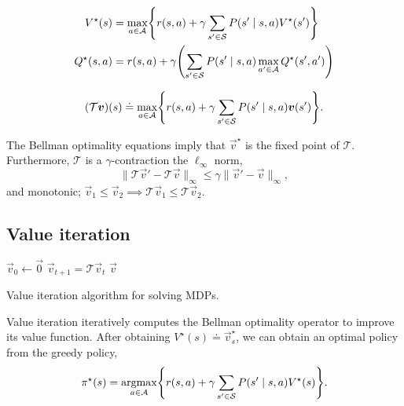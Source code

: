 \begin{theorem}
    \begin{align*}
        V^\star(s)   & = \max_{a\in \mathcal{A}} \lft\{ r(s,a) + \gamma \sum_{s' \in \mathcal{S}} P(s'\mid s,a) V^\star(s') \rgt\}   \\
        Q^\star(s,a) & = r(s,a) + \gamma \lft( \sum_{s' \in \mathcal{S}} P(s'\mid s,a) \max_{a'\in \mathcal{A}} Q^\star(s',a') \rgt) \\
    \end{align*}
\end{theorem}

\begin{definition}
    \[
        (\mathcal{T}\vec{v})(s) \doteq \max_{a\in \mathcal{A}} \lft\{ r(s,a) + \gamma \sum_{s'\in \mathcal{S}} P(s'\mid s,a) \vec{v}(s')  \rgt\}.
    \]
\end{definition}

The Bellman optimality equations imply that $\vec{v}^\star$ is the fixed point of $\mathcal{T}$.
Furthermore, $\mathcal{T}$ is a $\gamma$-contraction \wrt the $\ell_{\infty}$ norm, \[
    \| \mathcal{T} \vec{v}' - \mathcal{T} \vec{v} \|_\infty \leq \gamma \| \vec{v}' - \vec{v} \|_\infty,
\]
and monotonic; $\vec{v}_1 \leq \vec{v}_2 \implies \mathcal{T}\vec{v}_1 \leq \mathcal{T} \vec{v}_2$.

\subsection{Value iteration}

\begin{algorithm}
    \begin{algorithmic}[1]
        \State $\vec{v}_0 \gets \vec{0}$ 
        \State $\vec{v}_{t+1} = \mathcal{T} \vec{v}_t$
        \EndWhile
        \State \Return $\vec{v}$
    \end{algorithmic}
    \caption{Value iteration algorithm for solving MDPs.}
\end{algorithm}

Value iteration iteratively computes the Bellman optimality operator to improve its value function.
After obtaining $V^\star(s) \doteq \vec{v}^\star_s$, we can obtain an optimal policy from the
greedy policy, \[
    \pi^\star(s) = \argmax_{a\in \mathcal{A}} \lft\{ r(s,a) + \gamma \sum_{s'\in \mathcal{S}} P(s'\mid s,a) V^\star(s) \rgt\}.
\]

